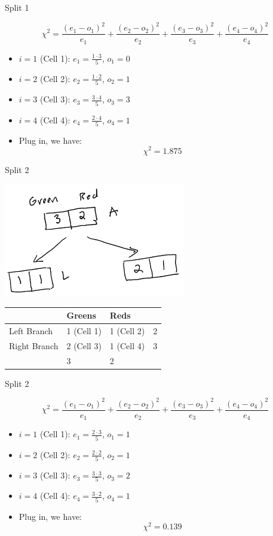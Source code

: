 \documentclass[
  ignorenonframetext,
]{beamer}
\begin{document}
\begin{frame}{Split 1}
\protect\hypertarget{split-1-1}{}

\[\chi^2 = \frac{(e_1-o_1)^2}{e_1}+\frac{(e_2-o_2)^2}{e_2}+\frac{(e_3-o_3)^2}{e_3}+\frac{(e_4-o_4)^2}{e_4}\]

\begin{itemize}
\item
  \(i=1\) (Cell 1): \(e_1 = \frac{1\cdot 3}{5}\), \(o_1 = 0\)
\item
  \(i=2\) (Cell 2): \(e_2 = \frac{1\cdot 2}{5}\), \(o_2 = 1\)
\item
  \(i=3\) (Cell 3): \(e_3 = \frac{3\cdot 4}{5}\), \(o_3 = 3\)
\item
  \(i=4\) (Cell 4): \(e_4 = \frac{2\cdot 4}{5}\), \(o_4 = 1\)
\item
  Plug in, we have: \[\chi^2 = 1.875\]
\end{itemize}

\end{frame}

\begin{frame}{Split 2}
\protect\hypertarget{split-2}{}

\includegraphics{images2/im3.png}

\begin{longtable}[]{@{}llll@{}}
\toprule
& Greens & Reds &\tabularnewline
\midrule
\endhead
Left Branch & 1 (Cell 1) & 1 (Cell 2) & 2\tabularnewline
Right Branch & 2 (Cell 3) & 1 (Cell 4) & 3\tabularnewline
& 3 & 2 &\tabularnewline
\bottomrule
\end{longtable}

\end{frame}

\begin{frame}{Split 2}
\protect\hypertarget{split-2-1}{}

\[\chi^2 = \frac{(e_1-o_1)^2}{e_1}+\frac{(e_2-o_2)^2}{e_2}+\frac{(e_3-o_3)^2}{e_3}+\frac{(e_4-o_4)^2}{e_4}\]

\begin{itemize}
\item
  \(i=1\) (Cell 1): \(e_1 = \frac{2\cdot 3}{5}\), \(o_1 = 1\)
\item
  \(i=2\) (Cell 2): \(e_2 = \frac{2\cdot 2}{5}\), \(o_2 = 1\)
\item
  \(i=3\) (Cell 3): \(e_3 = \frac{3\cdot 3}{5}\), \(o_3 = 2\)
\item
  \(i=4\) (Cell 4): \(e_4 = \frac{3\cdot 2}{5}\), \(o_4 = 1\)
\item
  Plug in, we have: \[\chi^2 = 0.139\]
\end{itemize}

\end{frame}
\end{document}
